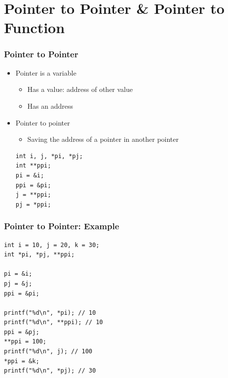 \documentclass{../c-lecture}
\begin{document}
\section{Pointer to Pointer \& Pointer to Function}

\begin{frame}[fragile]
  \frametitle{Pointer to Pointer}
  \begin{itemize}
    \item Pointer is a variable
    \begin{itemize}
      \item Has a value: address of other value
      \item Has an address
    \end{itemize}
    \item Pointer to pointer
    \begin{itemize}
      \item Saving the address of a pointer in another pointer
    \end{itemize}
    \begin{verbatim}
int i, j, *pi, *pj;
int **ppi;
pi = &i;
ppi = &pi;
j = **ppi;
pj = *ppi;
    \end{verbatim}
  \end{itemize}
\end{frame}

\begin{frame}[fragile]
  \frametitle{Pointer to Pointer: Example}
  \begin{verbatim}
int i = 10, j = 20, k = 30;
int *pi, *pj, **ppi;

pi = &i;
pj = &j;
ppi = &pi;

printf("%d\n", *pi); // 10
printf("%d\n", **ppi); // 10
ppi = &pj;
**ppi = 100;
printf("%d\n", j); // 100
*ppi = &k;
printf("%d\n", *pj); // 30
  \end{verbatim}
\end{frame}
\end{document}
